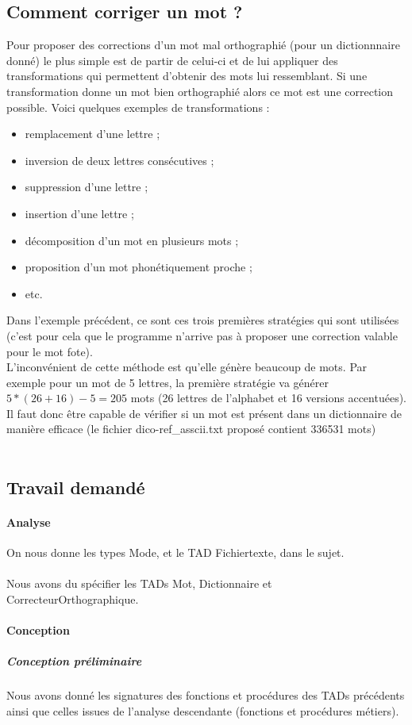 \subsection{Comment corriger un mot ?}
Pour proposer des corrections d'un mot mal orthographié (pour un dictionnnaire donné) le plus simple est de partir de celui-ci 
et de lui appliquer des transformations qui permettent d'obtenir des mots lui ressemblant. 
Si une transformation donne un mot bien orthographié alors ce mot est une correction possible. Voici quelques exemples de transformations :
\begin{itemize}
\item remplacement d'une lettre ;
\item inversion de deux lettres consécutives ;
\item suppression d'une lettre ;
\item insertion d'une lettre ;
\item décomposition d'un mot en plusieurs mots ;
\item proposition d'un mot phonétiquement proche ;
\item etc.
\end{itemize}

Dans l'exemple précédent, ce sont ces trois premières stratégies qui sont utilisées 
(c'est pour cela que le programme n'arrive pas à proposer une correction valable pour le mot fote).\\
L'inconvénient de cette méthode est qu'elle génère beaucoup de mots. Par exemple pour un mot de 5 lettres, la première stratégie va générer $5 *(26 + 16) -5 = 205$ mots (26 lettres de l'alphabet et 16 versions accentuées). Il faut donc être capable de vérifier si un mot est présent dans un dictionnaire de manière efficace (le fichier dico-ref\_asscii.txt proposé contient 336531 mots)\\
\\
\subsection{Travail demandé}
\paragraph{Analyse}
On nous donne les types Mode, et le TAD Fichiertexte, dans le sujet.\\
\\
Nous avons du spécifier les TADs Mot, Dictionnaire et CorrecteurOrthographique.\\
\paragraph{Conception}
\subparagraph{Conception préliminaire}
Nous avons donné les signatures des fonctions et procédures des TADs précédents ainsi que celles issues de l'analyse descendante 
(fonctions et procédures métiers).\\

